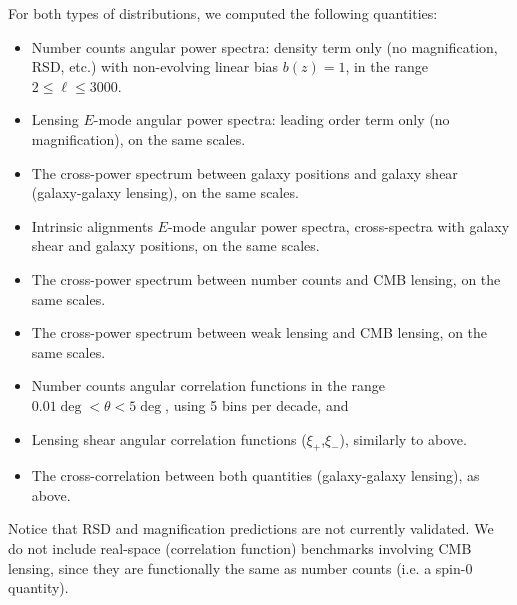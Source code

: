\documentclass[\docopts]{\docclass}
\begin{document}
For both types of distributions, we computed the following quantities:
\begin{itemize}
\item Number counts angular power spectra: density term only (no magnification, RSD, etc.) with non-evolving linear bias $b(z) = 1$, in the range $2 \leq \ell \leq 3000$.
\item Lensing $E$-mode angular power spectra: leading order term only (no magnification), on the same scales.
\item The cross-power spectrum between galaxy positions and galaxy shear (galaxy-galaxy lensing), on the same scales.
\item Intrinsic alignments $E$-mode angular power spectra, cross-spectra with galaxy shear and galaxy positions, on the same scales.
\item The cross-power spectrum between number counts and CMB lensing, on the same scales.
\item The cross-power spectrum between weak lensing and CMB lensing, on the same scales.
\item Number counts angular correlation functions in the range $0.01 \deg < \theta < 5 \deg$, using 5 bins per decade, and
\item Lensing shear angular correlation functions ($\xi_+$,$\xi_-$), similarly to above.
\item The cross-correlation between both quantities (galaxy-galaxy lensing), as above.
\end{itemize}
Notice that RSD and magnification predictions are not currently validated. We do not include real-space (correlation function) benchmarks involving CMB lensing, since they are functionally the same as number counts (i.e. a spin-0 quantity).
\end{document}
